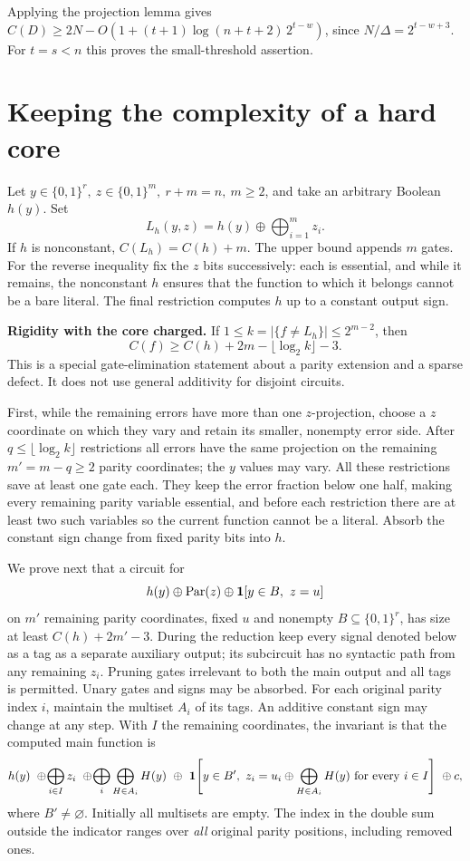 \documentclass[11pt]{article}
\begin{document}
Applying the projection lemma gives $C(D)\ge 2N-O(1+(t+1)\log(n+t+2)\,2^{t-w})$, since $N/\Delta=2^{t-w+3}$. For $t=s<n$ this proves the small-threshold assertion.
\section{Keeping the complexity of a hard core}
Let \(y\in\{0,1\}^r,\ z\in\{0,1\}^m,\ r+m=n,\ m\ge2\), and take an arbitrary Boolean \(h(y)\). Set
\[
                   L_h(y,z)=h(y)\oplus\bigoplus_{i=1}^m z_i .
\]
If \(h\) is nonconstant, \(C(L_h)=C(h)+m\). The upper bound appends \(m\) gates. For the reverse inequality fix the \(z\) bits successively: each is essential, and while it remains, the nonconstant \(h\) ensures that the function to which it belongs cannot be a bare literal. The final restriction computes \(h\) up to a constant output sign.

\textbf{Rigidity with the core charged.} If \(1\le k=|\{f\ne L_h\}|\le 2^{m-2}\), then
\[
                    C(f)\ge C(h)+2m-\lfloor\log_2 k\rfloor-3. \tag{3}
\]
This is a special gate-elimination statement about a parity extension and a sparse defect. It does not use general additivity for disjoint circuits.

First, while the remaining errors have more than one \(z\)-projection, choose a \(z\) coordinate on which they vary and retain its smaller, nonempty error side. After \(q\le\lfloor\log_2 k\rfloor\) restrictions all errors have the same projection on the remaining \(m'=m-q\ge2\) parity coordinates; the \(y\) values may vary. All these restrictions save at least one gate each. They keep the error fraction below one half, making every remaining parity variable essential, and before each restriction there are at least two such variables so the current function cannot be a literal. Absorb the constant sign change from fixed parity bits into \(h\).

We prove next that a circuit for
\[
 h(y)\oplus {\rm Par}(z)\oplus {\bf1}[y\in B,\ z=u]
\]
on \(m'\) remaining parity coordinates, fixed \(u\) and nonempty \(B\subseteq\{0,1\}^r\), has size at least \(C(h)+2m'-3\). During the reduction keep every signal denoted below as a tag as a separate auxiliary output; its subcircuit has no syntactic path from any remaining \(z_i\). Pruning gates irrelevant to both the main output and all tags is permitted. Unary gates and signs may be absorbed. For each original parity index \(i\), maintain the multiset \(A_i\) of its tags. An additive constant sign may change at any step. With \(I\) the remaining coordinates, the invariant is that the computed main function is
\[
 h(y)\ \oplus\! \bigoplus_{i\in I}z_i\
 \oplus\! \bigoplus_i\bigoplus_{H\in A_i}H(y)
 \ \oplus\ {\bf1}\!\left[y\in B',\
    z_i=u_i\oplus\bigoplus_{H\in A_i}H(y)\ {\rm for\ every}\ i\in I\right]
 \ \oplus c ,
\]
where \(B'\ne\varnothing\). Initially all multisets are empty. The index in the double sum outside the indicator ranges over \emph{all} original parity positions, including removed ones.
\end{document}
